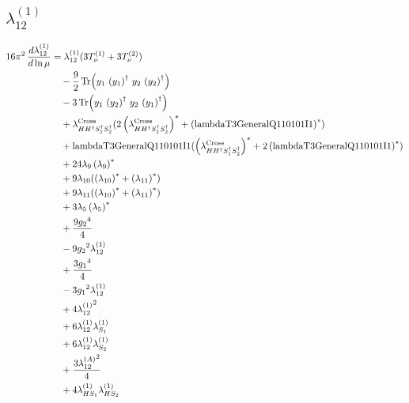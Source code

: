 \documentclass[10pt,a4paper]{article}
\begin{document}
\subsection*{$\lambda_{12}^{(1)}$}
\begin{align*}
16\pi^2\,\frac{d \lambda_{12}^{(1)}}{d\ln\mu} &={\lambda_{12}^{(1)}} (3 T_{\nu}^{(1)}+3 T_{\nu}^{(2)}) \\
&\quad -\frac{9}{2} \operatorname{Tr}\!\left({y_1}\,\left({y_1}\right)^{\dagger}\,{y_2}\,\left({y_2}\right)^{\dagger}\right) \\
&\quad -3 \operatorname{Tr}\!\left({y_1}\,\left({y_2}\right)^{\dagger}\,{y_2}\,\left({y_1}\right)^{\dagger}\right) \\
&\quad +{\lambda_{H H^\dagger S_1^\dagger S_2^\dagger}^{\rm Cross}} (2 \left({\lambda_{H H^\dagger S_1^\dagger S_2^\dagger}^{\rm Cross}}\right)^{*}+\left(\text{lambdaT3GeneralQ110101I1}\right)^{*}) \\
&\quad +\text{lambdaT3GeneralQ110101I1} (\left({\lambda_{H H^\dagger S_1^\dagger S_2^\dagger}^{\rm Cross}}\right)^{*}+2 \left(\text{lambdaT3GeneralQ110101I1}\right)^{*}) \\
&\quad +24 {\lambda_{9}} \left({\lambda_{9}}\right)^{*} \\
&\quad +9 {\lambda_{10}} (\left({\lambda_{10}}\right)^{*}+\left({\lambda_{11}}\right)^{*}) \\
&\quad +9 {\lambda_{11}} (\left({\lambda_{10}}\right)^{*}+\left({\lambda_{11}}\right)^{*}) \\
&\quad +3 {\lambda_5} \left({\lambda_5}\right)^{*} \\
&\quad +\frac{9 {g_2}^4}{4} \\
&\quad -9 {g_2}^2 {\lambda_{12}^{(1)}} \\
&\quad +\frac{3 {g_1}^4}{4} \\
&\quad -3 {g_1}^2 {\lambda_{12}^{(1)}} \\
&\quad +4 {\lambda_{12}^{(1)}}^2 \\
&\quad +6 {\lambda_{12}^{(1)}} {\lambda_{S_1}^{(1)}} \\
&\quad +6 {\lambda_{12}^{(1)}} {\lambda_{S_2}^{(1)}} \\
&\quad +\frac{3 {\lambda_{12}^{(A)}}^2}{4} \\
&\quad +4 {\lambda_{HS_1}^{(1)}} {\lambda_{HS_2}^{(1)}} \\
\end{align*}
\end{document}
